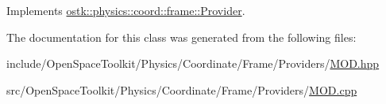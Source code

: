 Implements \hyperlink{classostk_1_1physics_1_1coord_1_1frame_1_1_provider_a27acab0012649796b97956fed1a91493}{ostk\+::physics\+::coord\+::frame\+::\+Provider}.



The documentation for this class was generated from the following files\+:\begin{DoxyCompactItemize}
\item 
include/\+Open\+Space\+Toolkit/\+Physics/\+Coordinate/\+Frame/\+Providers/\hyperlink{_m_o_d_8hpp}{M\+O\+D.\+hpp}\item 
src/\+Open\+Space\+Toolkit/\+Physics/\+Coordinate/\+Frame/\+Providers/\hyperlink{_m_o_d_8cpp}{M\+O\+D.\+cpp}\end{DoxyCompactItemize}
